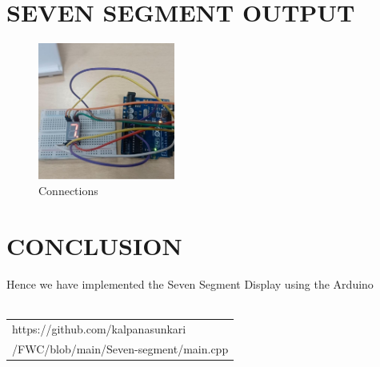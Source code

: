 \documentclass[journal,12pt,twocolumn]{IEEEtran}
\begin{document}
\section{SEVEN SEGMENT OUTPUT}
\begin{figure}[H]
\centering
\includegraphics[width=0.4\textwidth]{1.jpg}
\caption{Connections}
\label{fig:connection.jpg}
\end{figure}

    \section{CONCLUSION}
    Hence we have implemented the Seven Segment Display using the Arduino \\
    \\
    \begin{tabularx}{0.46\textwidth} { 
  | >{\centering\arraybackslash}X |}
  \hline 
https://github.com/kalpanasunkari\\ /FWC/blob/main/Seven-segment/main.cpp\\
  \hline
\end{tabularx}

 
\end{document}
